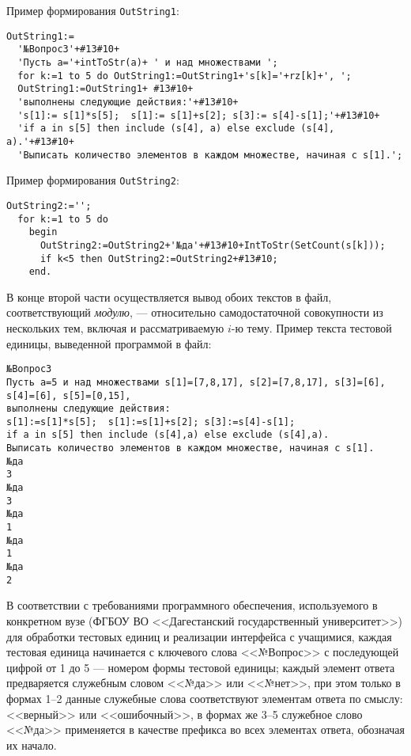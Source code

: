 Пример формирования \verb'OutString1':
\par\smallskip
\begin{verbatim}
OutString1:=
  '№Вопрос3'+#13#10+
  'Пусть a='+intToStr(a)+ ' и над множествами ';
  for k:=1 to 5 do OutString1:=OutString1+'s[k]='+rz[k]+', ';
  OutString1:=OutString1+ #13#10+
  'выполнены следующие действия:'+#13#10+
  's[1]:= s[1]*s[5];  s[1]:= s[1]+s[2]; s[3]:= s[4]-s[1];'+#13#10+
  'if a in s[5] then include (s[4], a) else exclude (s[4], a).'+#13#10+
  'Выписать количество элементов в каждом множестве, начиная с s[1].';
\end{verbatim}

Пример формирования \verb'OutString2':
\par\smallskip
\begin{verbatim}
OutString2:='';
  for k:=1 to 5 do
    begin
      OutString2:=OutString2+'№да'+#13#10+IntToStr(SetCount(s[k]));
      if k<5 then OutString2:=OutString2+#13#10;
    end.
\end{verbatim}

В конце второй части осуществляется вывод обоих текстов в файл, соответствующий \textit{ модулю}, --- относительно самодостаточной совокупности из нескольких тем, включая и рассматриваемую $i$-ю тему.
Пример текста тестовой единицы, выведенной программой в файл:
\par\smallskip
\begin{verbatim}
№Вопрос3
Пусть a=5 и над множествами s[1]=[7,8,17], s[2]=[7,8,17], s[3]=[6],
s[4]=[6], s[5]=[0,15],
выполнены следующие действия:
s[1]:=s[1]*s[5];  s[1]:=s[1]+s[2]; s[3]:=s[4]-s[1];
if a in s[5] then include (s[4],a) else exclude (s[4],a).
Выписать количество элементов в каждом множестве, начиная с s[1].
№да
3
№да
3
№да
1
№да
1
№да
2
\end{verbatim}

В соответствии с требованиями программного обеспечения, используемого в конкретном вузе (ФГБОУ ВО <<Дагестанский государственный университет>>) для обработки тестовых единиц и реализации интерфейса с учащимися, каждая тестовая единица начинается с ключевого слова <<№Вопрос>> с последующей цифрой от 1 до 5 --- номером формы тестовой единицы; каждый элемент ответа предваряется служебным словом <<№да>> или <<№нет>>, при этом только в формах 1--2 данные служебные слова соответствуют элементам ответа по смыслу: <<верный>> или <<ошибочный>>, в формах же 3--5 служебное слово <<№да>> применяется в качестве префикса во всех элементах ответа, обозначая их начало.









